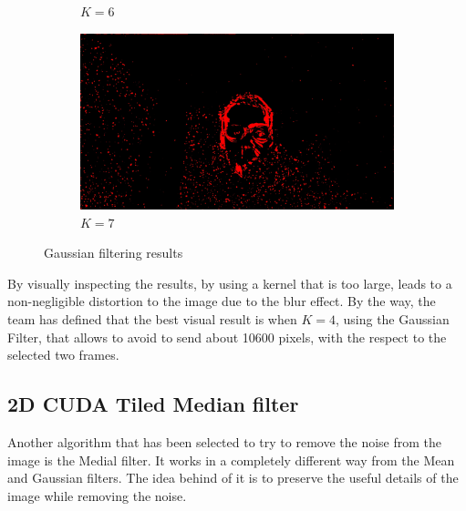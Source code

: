 \documentclass[paper=a4, fontsize=10pt]{scrartcl}	%
\begin{document}
\begin{figure}[H]
\begin{subfigure}{0.2\textwidth}
		\caption{$K=6$}
	\end{subfigure}%
	\begin{subfigure}{0.2\textwidth}
		\includegraphics[width=\linewidth]{images/heatmap/img_gaus/img_man_red_g7.jpg}
		\caption{$K=7$}
	\end{subfigure}
	
	\caption{Gaussian filtering results}
	\label{fig:gaus_filter}
	\end{figure}
	
	By visually inspecting the results, by using a kernel that is too large, leads to a non-negligible distortion to the image due to the blur effect. By the way, the team has defined that the best visual result is when $K=4$, using the Gaussian Filter, that allows to avoid to send about 10600 pixels, with the respect to the selected two frames.

	\subsection{2D CUDA Tiled Median filter}
	Another algorithm that has been selected to try to remove the noise from the image is the Medial filter. It works in a completely different way from the Mean and Gaussian filters. The idea behind of it is to preserve the useful details of the image while removing the noise.
	
\end{document}
